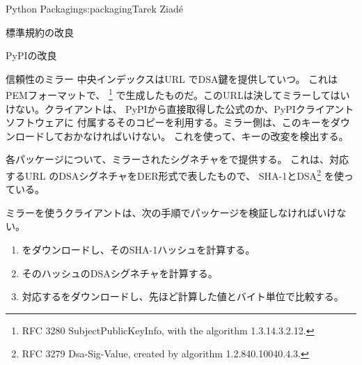 \begin{aosachapter}{Python Packaging}{s:packaging}{Tarek Ziad\'{e}}
\begin{aosasect1}{標準規約の改良}
\begin{aosasect2}{PyPIの改良}
\begin{aosasect3}{信頼性のミラー}
中央インデックスはURL でDSA鍵を提供していつ。
これはPEMフォーマットで、
\footnote{RFC 3280 SubjectPublicKeyInfo, with the algorithm 1.3.14.3.2.12.}
で生成したものだ。このURLは決してミラーしてはいけない。クライアントは、
PyPIから直接取得した公式のか、PyPIクライアントソフトウェアに
付属するそのコピーを利用する。ミラー側は、このキーをダウンロードしておかなければいけない。
これを使って、キーの改変を検出する。

各パッケージについて、ミラーされたシグネチャをで提供する。
これは、対応するURL のDSAシグネチャをDER形式で表したもので、
SHA-1とDSA\footnote{RFC 3279 Dsa-Sig-Value, created by algorithm   1.2.840.10040.4.3.}
を使っている。

ミラーを使うクライアントは、次の手順でパッケージを検証しなければいけない。

\begin{enumerate}

  \item {}をダウンロードし、そのSHA-1ハッシュを計算する。

  \item そのハッシュのDSAシグネチャを計算する。

  \item 対応するをダウンロードし、先ほど計算した値とバイト単位で比較する。


\end{enumerate}
\end{aosasect3}
\end{aosasect2}
\end{aosasect1}
\end{aosachapter}
